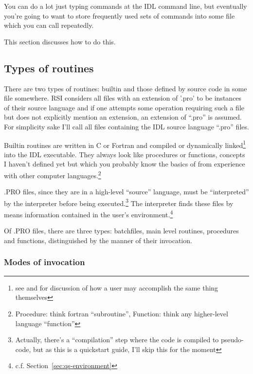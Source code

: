   You can do a lot just typing commands at the IDL command line, but
  eventually you're going to want to store frequently used sets of
  commands into some file which you can call repeatedly.

  This section discusses how to do this.

\subsection{Types of routines}\label{sec:qs-Routine-Types}
        
    There are two types of routines: builtin and those defined by
    source code in some file somewhere. RSI considers all files with
    an extension of '.pro' to be instances of their source language
    and if one attempts some operation requiring such a file but does
    not explicitly mention an extension, an extension of ``.pro'' is
    assumed. For simplicity sake I'll call all files containing the
    IDL source language ``.pro'' files. 

    Builtin routines are written in C or Fortran and compiled or
    dynamically linked\footnote{see  and
     for discussion of how a user may
    accomplish the same thing themselves} into the IDL
    executable. They always look like procedures or functions,
    concepts I haven't defined yet but which you probably know the
    basics of from experience with other computer
    languages.\footnote{Procedure: think fortran ``subroutine'',
    Function: think any higher-level language ``function''}

    .PRO files, since they are in a high-level ``source'' language,
    must be ``interpreted'' by the interpreter before being
    executed.\footnote{Actually, there's a ``compilation'' step where
    the code is compiled to pseudo-code, but as this is a quickstart
    guide, I'll skip this for the moment} The interpreter finds these
    files by means information contained in the user's
    environment.\footnote{c.f. Section~\ref{sec:qs-environment} }

    Of .PRO files, there are three types: batchfiles, main level
    routines, procedures and functions, distinguished by the manner of
    their invocation. 

\subsubsection{Modes of invocation}\label{sec:qs-Routines-Invocations}

